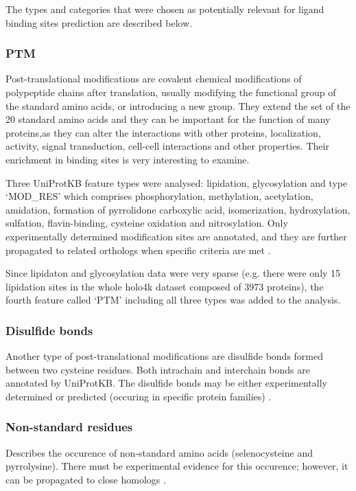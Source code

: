 The types and categories that were chosen as potentially relevant for ligand binding sites prediction are described below.


\subsubsection{PTM}
Post-translational modifications are covalent chemical modifications of polypeptide chains after translation, usually modifying the functional group of the standard amino acids, or introducing a new group. They extend the set of the 20 standard amino acids and they can be important for the function of many proteins,as they can alter the interactions with other proteins, localization, activity, signal transduction, cell-cell interactions and other properties. Their enrichment in binding sites is very interesting to examine.

Three UniProtKB feature types were analysed: lipidation, glycosylation and type `MOD\_RES' which comprises phosphorylation, methylation, acetylation, amidation, formation of pyrrolidone carboxylic acid, isomerization, hydroxylation, sulfation, flavin-binding, cysteine oxidation and nitrosylation. Only experimentally determined modification sites are annotated, and they are further propagated to related orthologs when specific criteria are met \cite{mod_res}.

Since lipidaton and glycosylation data were very sparse (e.g. there were only 15 lipidation sites in the whole holo4k dataset composed of 3973 proteins), the fourth feature called `PTM' including all three types was added to the analysis.

\subsubsection{Disulfide bonds}
Another type of post-translational modifications are disulfide bonds formed between two cysteine residues. Both intrachain and interchain bonds are annotated by \mbox{UniProtKB}. The disulfide bonds may be either experimentally determined or predicted (occuring in specific protein families) \cite{disulfid}.

\subsubsection{Non-standard residues}
Describes the occurence of non-standard amino acids (selenocysteine and pyrrolysine). There must be experimental evidence for this occurence; however, it can be propagated to close homologs \cite{non_std}.

